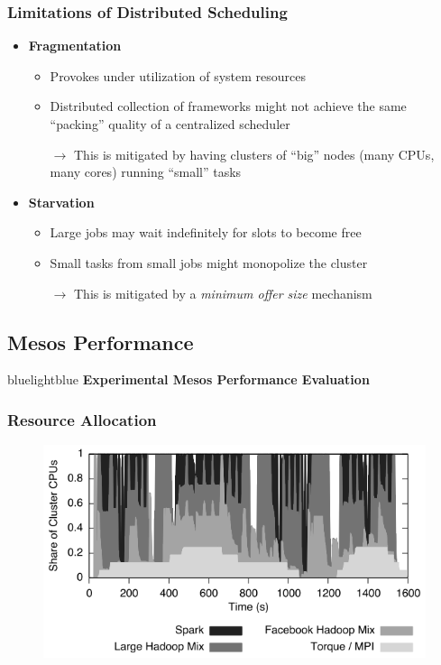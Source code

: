 \begin{frame}
\frametitle{Limitations of Distributed Scheduling}
\begin{itemize}
	\item {\bf Fragmentation}
	\begin{itemize}
		\item Provokes under utilization of system resources
		\item Distributed collection of frameworks might not achieve the same ``packing'' quality of a centralized scheduler
		\item[$\to$] This is mitigated by having clusters of ``big'' nodes (many CPUs, many cores) running ``small'' tasks
	\end{itemize}
	\item {\bf Starvation}
	\begin{itemize}
		\item Large jobs may wait indefinitely for slots to become free
		\item Small tasks from small jobs might monopolize the cluster
		\item[$\to$] This is mitigated by a {\it minimum offer size} mechanism
	\end{itemize}
\end{itemize}
\end{frame}

\subsection{Mesos Performance}
\begin{frame}
 \begin{colorblock}{blue}{lightblue}{ }
    \Large \textbf{Experimental Mesos Performance Evaluation}
  \end{colorblock}
\end{frame}

\begin{frame}
\frametitle{Resource Allocation}
\begin{figure}[h]
  \centering
  \includegraphics[scale=0.55]{./figures/mesos_perf_fm}
  \label{fig:mesos_perf_ru}
\end{figure}
\end{frame}

